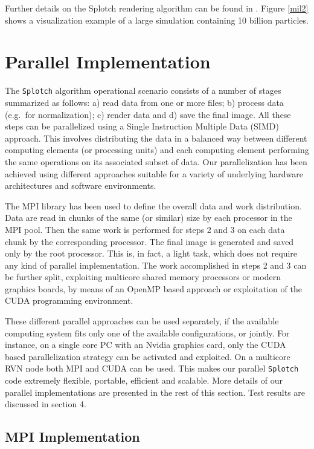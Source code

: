 \documentclass[1p,times]{elsarticle}
\begin{document}
Further details on the Splotch rendering algorithm can be found in \citep{2008NJPh...10l5006D}. 
Figure \ref{mil2} shows a visualization example of a large simulation
containing 10 billion particles.

\section{Parallel Implementation}
\label{parallel}

The {\tt Splotch} algorithm operational scenario consists of a number of 
stages summarized as follows: a) read data from one or more files; b) process data (e.g.\ for normalization); c) render data and d) save the final image. All these steps can be parallelized using a
Single Instruction Multiple Data (SIMD) approach. This involves distributing the data 
in a balanced way between different computing elements (or processing units) and each computing element performing the same operations on its associated subset of data. Our parallelization has been achieved using different approaches suitable for a variety of underlying hardware architectures and software environments.

The MPI library \cite{mpi} has been used to define the overall data and work 
distribution. Data are read in chunks of the same (or similar) size by each processor
in the MPI pool. Then the same work is performed for steps 2 and 3 on each data chunk by the
corresponding processor. The final image is generated and saved only by the root processor. This is, in fact, a light task, which does not require any kind of parallel implementation.
The work accomplished in steps 2 and 3 can be further split, exploiting 
multicore shared memory processors or modern graphics boards, by means of
an OpenMP \cite{openmp} based approach or exploitation of the CUDA \cite{cuda} programming 
environment. 

These different parallel approaches can be used separately, 
if the available computing system fits only one of the available configurations, or jointly. 
For instance, on a single core PC with an Nvidia graphics card, only the CUDA based
parallelization strategy can be activated and exploited. On a multicore RVN \cite{rvn} 
node both MPI and CUDA can be used. This makes our parallel {\tt Splotch} code 
extremely flexible, portable, efficient and scalable. More details of our parallel implementations are presented in the rest of this section. Test results are discussed in section 4.

\subsection{MPI Implementation}
\label{mpi}
\end{document}
